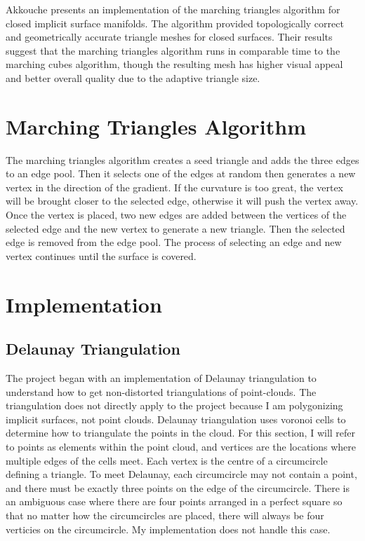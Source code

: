 \documentclass[conference]{acmsiggraph}
\begin{document}
Akkouche presents an implementation of the marching triangles algorithm for
closed implicit surface manifolds\cite{Akkouche2001}. The algorithm provided
topologically correct and geometrically accurate triangle meshes for closed
surfaces. Their results suggest that the marching triangles algorithm runs in
comparable time to the marching cubes algorithm, though the resulting mesh has
higher visual appeal and better overall quality due to the adaptive triangle
size.

\section{Marching Triangles Algorithm}
The marching triangles algorithm creates a seed triangle and adds the three
edges to an edge pool. Then it selects one of the edges at random then
generates a new vertex in the direction of the gradient. If the curvature is
too great, the vertex will be brought closer to the selected edge, otherwise it
will push the vertex away. Once the vertex is placed, two new edges are added
between the vertices of the selected edge and the new vertex to generate a new
triangle. Then the selected edge is removed from the edge pool. The process of
selecting an edge and new vertex continues until the surface is covered.

\section {Implementation}

\subsection{Delaunay Triangulation}
The project began with an implementation of Delaunay triangulation to
understand how to get non-distorted triangulations of point-clouds. The
triangulation does not directly apply to the project because I am polygonizing
implicit surfaces, not point clouds. Delaunay triangulation uses voronoi cells
to determine how to triangulate the points in the cloud. For this section, I
will refer to points as elements within the point cloud, and vertices are the
locations where multiple edges of the cells meet. Each vertex is the centre of
a circumcircle defining a triangle. To meet Delaunay, each circumcircle may not
contain a point, and there must be exactly three points on the edge of the
circumcircle. There is an ambiguous case where there are four points arranged
in a perfect square so that no matter how the circumcircles are placed, there
will always be four verticies on the circumcircle. My implementation does not
handle this case.
\end{document}
